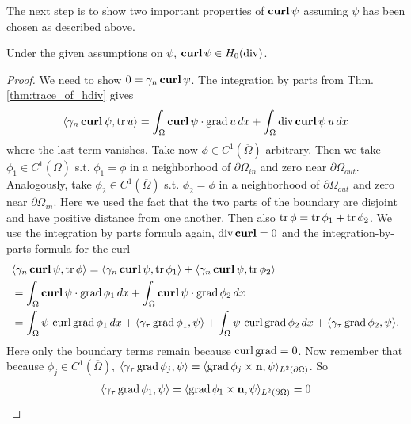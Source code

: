 \documentclass[../master_thesis.tex]{subfiles}
\begin{document}
The next step is to show two important properties of $\veccurl \psi$ 
assuming $\psi$ has been chosen as described above.
\begin{proposition}
    Under the given assumptions on $\psi$, $\veccurl\psi \in H_0(\diver)$.
\end{proposition}
\begin{proof}
    We need to show $0 = \gamma_n \veccurl \psi$. The integration by parts from Thm.\,\ref{thm:trace_of_hdiv} gives
    \begin{align*}
        \langle \gamma_n \veccurl \psi , \tr u \rangle 
        = \int_\Omega \veccurl \psi \cdot \grad u \, dx 
            + \int_\Omega \diver \veccurl \psi \, u \, dx 
    \end{align*}
    where the last term vanishes. Take now $\phi \in C^1(\overline{\Omega})$ 
    arbitrary. Then we take $\phi_1 \in C^1(\overline{\Omega})$ s.t. $\phi_1 = \phi$ in 
    a neighborhood of $\partial \Omega_{in}$ and zero near $\partial \Omega_{out}$. 
    Analogously, take $\phi_2 \in C^1(\overline{\Omega})$ s.t. $\phi_2 = \phi$ in 
    a neighborhood of $\partial \Omega_{out}$ and zero near $\partial \Omega_{in}$. Here we used the fact that 
    the two parts of the boundary are disjoint and have positive distance from one another.
    Then also $\tr \phi = \tr \phi_1 + \tr \phi_2$.
    We use the integration by parts formula again, $\diver \veccurl = 0$ and the 
    integration-by-parts formula for the curl
    \begin{align*}
        &\langle \gamma_n \veccurl \psi , \tr \phi \rangle 
        = \langle \gamma_n \veccurl \psi , \tr \phi_1 \rangle + \langle \gamma_n \veccurl \psi , \tr \phi_2 \rangle
        \\ &= \int_\Omega \veccurl \psi \cdot \grad \phi_1 \, dx + \int_\Omega \veccurl \psi \cdot \grad \phi_2 \, dx
        \\ &= \int_\Omega \psi \, \curl \grad \phi_1 \, dx + \langle \gamma_\tau \grad \phi_1, \psi \rangle
            + \int_\Omega \psi \, \curl \grad \phi_2 \, dx + \langle \gamma_\tau \grad \phi_2, \psi \rangle.
    \end{align*}
    Here only the boundary terms remain because $\curl \grad =0$.
    Now remember that because $\phi_j \in C^1(\overline{\Omega})$, 
    $\langle \gamma_\tau \grad \phi_j, \psi \rangle 
    = \langle \grad \phi_j \times \mathbf{n}, \psi \rangle_{L^2(\partial \Omega)}$. So 
    \begin{align*}
        \langle \gamma_\tau \grad \phi_1, \psi \rangle 
        = \langle \grad \phi_1 \times \mathbf{n}, \psi \rangle_{L^2(\partial \Omega)} = 0

\end{align*}
\end{proof}
\end{document}
